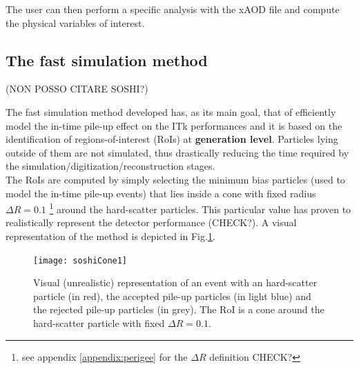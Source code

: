 \documentclass[a4paper,twoside,12pt]{article}
\begin{document}
The user can then perform a specific analysis with the xAOD file and compute the physical
variables of interest.

\subsection{The fast simulation method}
(NON POSSO CITARE SOSHI?)

The fast simulation method developed has, as its main goal, that of efficiently model the
in-time pile-up effect on the ITk performances and it is based on the identification of 
regions-of-interest (RoIs) at \textbf{generation level}. Particles lying outside of them are not 
simulated, thus drastically reducing the time required by the simulation/digitization/reconstruction stages. \\

The RoIs are computed by simply selecting the minimum bias particles (used to model the in-time
pile-up events) that lies inside a cone with fixed radius $\Delta R = 0.1$ \footnote{see appendix \ref{appendix:perigee} for the $\Delta R$ definition CHECK?}
around the hard-scatter particles. This particular value has proven to realistically represent the detector performance (CHECK?). A visual
representation of the method is depicted in Fig.\ref{fig:soshiCone1}.\\

\begin{figure} [h]
	\centering
	\texttt{[image: soshiCone1]}
	\caption{Visual (unrealistic) representation of an event with an hard-scatter particle (in red), 
	the accepted pile-up particles (in light blue) and the rejected pile-up particles (in grey).
	The RoI is a cone around the hard-scatter particle with fixed $\Delta R = 0.1$.}
	\label{fig:soshiCone1}
\end{figure}
\end{document}

